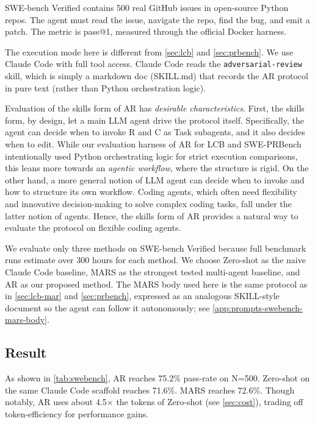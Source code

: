 \documentclass{article}
\begin{document}
SWE-bench Verified \citep{swebench-verified} contains 500 real GitHub
issues in open-source Python repos. The agent must read the issue, navigate the repo, find the
bug, and emit a patch. The metric is pass@1, measured through the
official Docker harness.

The execution mode here is different from \autoref{sec:lcb} and
\autoref{sec:prbench}. We use Claude Code with full tool access. Claude
Code reads the \texttt{adversarial-review} skill, which is simply a markdown doc (SKILL.md) that records the AR protocol in pure text (rather than Python orchestration logic). 

Evaluation of the skills form of AR has \textit{desirable characteristics}. First, the skills form, by design, let a main LLM agent drive the protocol itself. Specifically, the agent can decide when to invoke R and C as Task
subagents, and it also decides when to edit. While our evaluation harness of AR for LCB and SWE-PRBench intentionally used Python orchestrating logic for strict execution comparisons, this leans more towards an \textit{agentic workflow}, where the structure is rigid. On the other hand, a more general notion of LLM agent can decide when to invoke and how to structure its own workflow. Coding agents, which often need flexibility and innovative decision-making to solve complex coding tasks, fall under the latter notion of agents. Hence, the skills form of AR provides a natural way to evaluate the protocol on flexible coding agents. 

We evaluate only three methods on SWE-bench Verified because full benchmark runs estimate over 300 hours for each method. We choose Zero-shot as the naive Claude Code baseline, MARS as the strongest tested multi-agent baseline, and AR as our proposed method. The MARS body used here is the same protocol as in \autoref{sec:lcb-mar} and \autoref{sec:prbench}, expressed as an analogous SKILL-style document so the agent can follow it autonomously; see \autoref{app:prompts-swebench-mars-body}.

\subsection{Result}
\label{sec:swebench-headline}

As shown in \autoref{tab:swebench}, AR reaches 75.2\% pass-rate on N=500.
Zero-shot on the same Claude Code scaffold reaches 71.6\%.
MARS reaches 72.6\%. Though notably, AR uses about 4.5$\times$ the tokens of
Zero-shot (see \autoref{sec:cost}), trading off token-efficiency for performance
gains.
\end{document}

